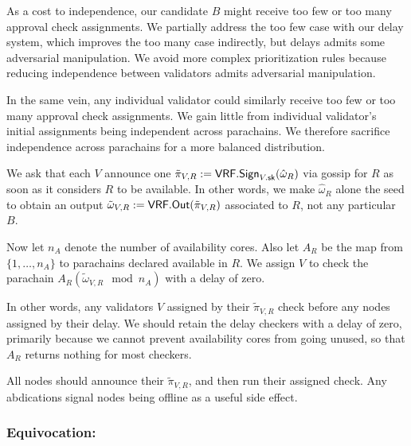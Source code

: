 As a cost to independence, our candidate $B$ might receive too few or too many approval check assignments.  We partially address the too few case with our delay system, which improves the too many case indirectly, but delays admits some adversarial manipulation.  We avoid more complex prioritization rules because reducing independence between validators admits adversarial manipulation.

In the same vein, any individual validator could similarly receive too few or too many approval check assignments.  We gain little from individual validator's initial assignments being independent across parachains.  We therefore sacrifice independence across parachains for a more balanced distribution.

We ask that each $V$ announce one $\tilde{\pi}_{V,R} := \mathsf{VRF}.\mathsf{Sign}_{V.\mathsf{sk}}(\hat{\omega}_R)$ via gossip for $R$ as soon as it considers $R$ to be available.  In other words, we make $\hat{\omega}_R$ alone the seed to obtain an output $\tilde{\omega}_{V,R} := \mathsf{VRF}.\mathsf{Out}(\tilde{\pi}_{V,R})$ associated to $R$, not any particular $B$.  

Now let $n_A$ denote the number of availability cores.  Also let $A_R$ be the map from $\{ 1,\ldots,n_A \}$ to parachains declared available in $R$.  We assign $V$ to check the parachain $A_R( \tilde{\omega}_{V,R} \mod n_A )$ with a delay of zero.  

In other words, any validators $V$ assigned by their $\tilde{\pi}_{V,R}$ check before any nodes assigned by their delay.  We should retain the delay checkers with a delay of zero, primarily because we cannot prevent availability cores from going unused, so that $A_R$ returns nothing for most checkers.  

All nodes should announce their $\tilde{\pi}_{V,R}$, and then run their assigned check.  Any abdications signal nodes being offline as a useful side effect.


\subsubsection{Equivocation:}


